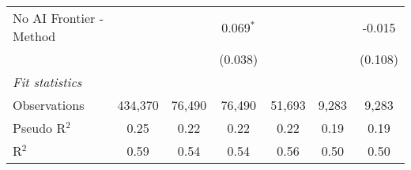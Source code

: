 \begin{tabular}{lcccccc}
   No AI Frontier - Method &               &               & 0.069$^{*}$   &               &               & -0.015\\   
                           &               &               & (0.038)       &               &               & (0.108)\\   
   \midrule
   \emph{Fit statistics}\\
   Observations            & 434,370       & 76,490        & 76,490        & 51,693        & 9,283         & 9,283\\  
   Pseudo R$^2$            & 0.25          & 0.22          & 0.22          & 0.22          & 0.19          & 0.19\\  
   R$^2$                   & 0.59          & 0.54          & 0.54          & 0.56          & 0.50          & 0.50\\  
   

\end{tabular}
